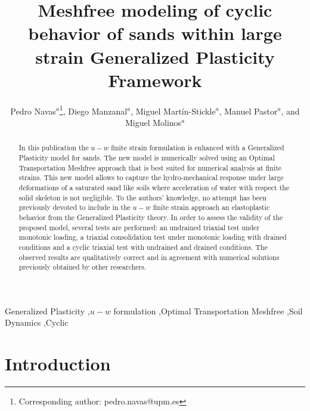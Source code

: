 \documentclass[preprint,12pt,a4paper]{elsarticle}
\begin{document}
\begin{frontmatter}

\title{Meshfree modeling of cyclic behavior of sands within large strain Generalized Plasticity Framework}

\author{
Pedro Navas$^a$\footnote{Corresponding author: pedro.navas@upm.es},
Diego Manzanal$^a$,
Miguel Mart\'in-Stickle$^{a}$,
Manuel Pastor$^a$,
and  Miguel Molinos$^a$
 }
 \address{
 $^a$ ETSI Caminos, Canales y Puertos, Universidad Polit\'ectnica de Madrid.\\ c. Prof. Aranguren 3, 28040 Madrid, Spain
}

\begin{abstract}

In this publication the $u-w$ finite strain formulation is enhanced with a Generalized Plasticity model for sands. The new model is numerically solved using an Optimal Transportation Meshfree approach that is best suited for numerical analysis at finite strains. This new model allows to capture the hydro-mechanical response under large deformations of a saturated sand like soils where acceleration of water with respect the solid skeleton is not negligible. To the authors' knowledge, no attempt has been previously devoted to include in the $u-w$ finite strain approach an elastoplastic behavior from the Generalized Plasticity theory. In order to assess the validity of the proposed model, several tests are performed: an undrained triaxial test under monotonic loading, a triaxial consolidation test under monotonic loading with drained conditions and a cyclic triaxial test with undrained and drained conditions. The observed results are qualitatively correct and in agreement with numerical solutions previously obtained by other researchers.
\end{abstract}

\begin{keyword}
Generalized Plasticity \sep $u-w$ formulation \sep Optimal Transportation Meshfree \sep Soil Dynamics \sep Cyclic
\end{keyword}

\end{frontmatter}

\linenumbers

\section{Introduction}
\label{sec:1}
\end{document}
